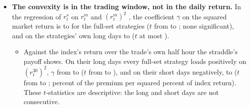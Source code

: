 \begin{itemize}
  different, nor are the \rhebNHarDistinctWord{} distinct HAR-set forecasts ($\beta$ from \rhebBetaHarMin{} to
  \rhebBetaHarMax).
  \begin{itemize}
  \item On the \rhebNDown{} days on which the market falls, the full-set strategies earn \rhebDownMeanFullMin{} to
    \rhebDownMeanFullMax\% of the premium, against \rhebDownRestFullMin{} to \rhebDownRestFullMax\% on the other days;
    none of the six differences is significant.
  \item On the \rhebNWorst{} days with the lowest market return (at most \rhebWorstCut\%) every full-set strategy
    has a negative mean return, \rhebWorstMeanFullMin{} to \rhebWorstMeanFullMax\% of the premium, against
    \rhebWorstRestFullMin{} to \rhebWorstRestFullMax\% on the other days ($t$ of the difference from
    \rhebWorstDiffTFullMin{} to \rhebWorstDiffTFullMax; significant at the 5\% level for \rhebWorstSigFullWord{} of
    the six). The short straddle returns \rhebWorstMeanShort\% on these days ($t = \rhebWorstDiffTShort$). The
    strategy has no linear exposure to the market, but like the short straddle it mostly is, it loses on the market's
    worst days.
  \end{itemize}
\item \textbf{The convexity is in the trading window, not in the daily return.} In the regression of $r^{s}_t$ on
  $r^{m}_t$ and $(r^{m}_t)^2$ \citep{TreynorMazuy1966}, the coefficient $\gamma$ on the squared market return is
  \rhebTmGammaFullMin{} to \rhebTmGammaFullMax{} for the full-set strategies ($t$ from \rhebTmGammaTFullMin{} to
  \rhebTmGammaTFullMax; none significant), and on the strategies' own long days
  \rhebTmGammaLongFullMin{} to \rhebTmGammaLongFullMax{} ($t$ at most \rhebTmGammaLongTFullMax).
  \begin{itemize}
  \item Against the index's return over the trade's own half hour the straddle's payoff shows. On their long days
    every full-set strategy loads positively on $(r^{30}_t)^2$, $\gamma$ from \rhebThirtyTmGammaLongFullMin{} to
    \rhebThirtyTmGammaLongFullMax{} ($t$ from \rhebThirtyTmGammaLongTFullMin{} to \rhebThirtyTmGammaLongTFullMax),
    and on their short days negatively, \rhebThirtyTmGammaShortFullMin{} to \rhebThirtyTmGammaShortFullMax{} ($t$
    from \rhebThirtyTmGammaShortTFullMin{} to \rhebThirtyTmGammaShortTFullMax; percent of the premium per squared
    percent of index return). These $t$-statistics are descriptive: the long and short days are not consecutive.

\end{itemize}
\end{itemize}
